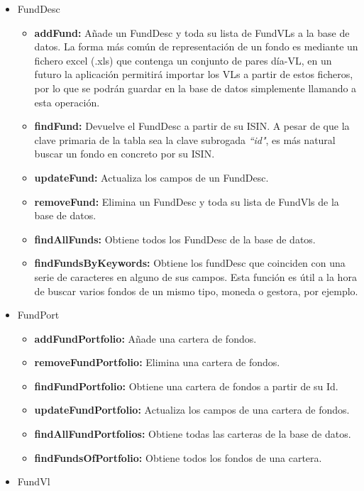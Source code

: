 \documentclass[12pt, a4paper]{article}
\begin{document}
\begin{itemize}
	\item FundDesc
						 \begin{itemize}
							\item \textbf{addFund:} Añade un FundDesc y toda su lista de FundVLs a la base de datos. La forma más común de representación de un fondo es mediante un fichero excel (.xls) que contenga un conjunto de pares día-\gls{VL}, en un futuro la aplicación permitirá importar los \gls{VL}s a partir de estos ficheros, por lo que se podrán guardar en la base de datos simplemente llamando a esta operación.
							\item \textbf{findFund:} Devuelve el FundDesc a partir de su \gls{ISIN}. A pesar de que la clave primaria de la tabla sea la clave subrogada \textit{``id"}, es más natural buscar un fondo en concreto por su \gls{ISIN}.
							\item \textbf{updateFund:} Actualiza los campos de un FundDesc.
							\item \textbf{removeFund:} Elimina un FundDesc y toda su lista de FundVls de la base de datos.
							\item \textbf{findAllFunds:} Obtiene todos los FundDesc de la base de datos.
							\item \textbf{findFundsByKeywords:} Obtiene los fundDesc que coinciden con una serie de caracteres en alguno de sus campos. Esta función es útil a la hora de buscar varios fondos de un mismo tipo, moneda o gestora, por ejemplo.
				 		 \end{itemize}
	\item FundPort
						\begin{itemize}
							\item \textbf{addFundPortfolio:} Añade una cartera de fondos.
							\item \textbf{removeFundPortfolio:} Elimina una cartera de fondos.
							\item \textbf{findFundPortfolio:} Obtiene una cartera de fondos a partir de su Id.
							\item \textbf{updateFundPortfolio:} Actualiza los campos de una cartera de fondos.
							\item \textbf{findAllFundPortfolios:} Obtiene todas las carteras de la base de datos.
							\item \textbf{findFundsOfPortfolio:} Obtiene todos los fondos de una cartera.
						\end{itemize}
					\newpage
	\item FundVl
						\begin{itemize}

\end{itemize}
\end{itemize}
\end{document}
